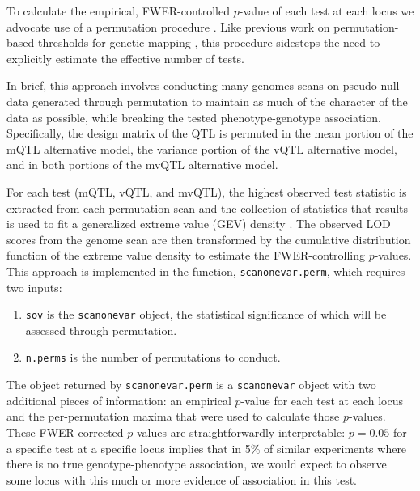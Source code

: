 \documentclass[9pt,twocolumn,twoside]{gsag3jnl}
\begin{document}
To calculate the empirical, FWER-controlled $p$-value of each test at each locus we advocate use of a permutation procedure \citep{CortyValdar2018bvh-biorxiv}.
Like previous work on permutation-based thresholds for genetic mapping \citep{Churchill1994,Carlborg2002}, this procedure sidesteps the need to explicitly estimate the effective number of tests.

In brief, this approach involves conducting many genomes scans on pseudo-null data generated through permutation to maintain as much of the character of the data as possible, while breaking the tested phenotype-genotype association.
Specifically, the design matrix of the QTL is permuted in the mean portion of the mQTL alternative model, the variance portion of the vQTL alternative model, and in both portions of the mvQTL alternative model.

For each test (mQTL, vQTL, and mvQTL), the highest observed test statistic is extracted from each permutation scan and the collection of statistics that results is used to fit a generalized extreme value (GEV) density \citep{Stephenson2002,Dudbridge2004,Valdar06cc}.
The observed LOD scores from the genome scan are then transformed by the cumulative distribution function of the extreme value density to estimate the FWER-controlling $p$-values.
This approach is implemented in the function, \texttt{scanonevar.perm}, which requires two inputs:
\begin{enumerate}
	\item \texttt{sov} is the \texttt{scanonevar} object, the statistical significance of which will be assessed through permutation.
	\item \texttt{n.perms} is the number of permutations to conduct.
\end{enumerate}
The object returned by \texttt{scanonevar.perm} is a \texttt{scanonevar} object with two additional pieces of information: an empirical $p$-value for each test at each locus and the per-permutation maxima that were used to calculate those $p$-values.
These FWER-corrected $p$-values are straightforwardly interpretable: $p = 0.05$ for a specific test at a specific locus implies that in 5\% of similar experiments where there is no true genotype-phenotype association, we would expect to observe some locus with this much or more evidence of association in this test.
\end{document}
